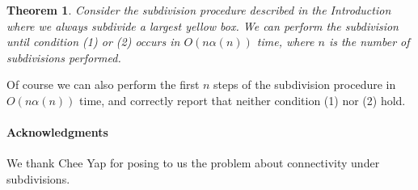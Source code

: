 \documentclass[a4paper,11pt]{article}
\newtheorem{theorem}{Theorem}
\begin{document}
\begin{theorem}
	Consider the subdivision procedure described in the Introduction where
	we always subdivide a largest yellow box.
	We can perform the subdivision until condition (1) or (2) occurs in $O(n\alpha (n))$ time,
	where $n$ is the number of subdivisions performed.	
\end{theorem}

Of course we can also perform the first $n$ steps of the subdivision procedure
in $O(n\alpha (n))$ time, and correctly report that neither condition (1) nor (2) hold.


\paragraph{Acknowledgments} We thank Chee Yap for posing to us the problem about connectivity under subdivisions.
\end{document}

